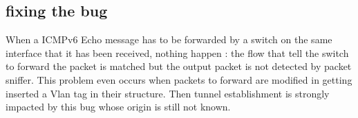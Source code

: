 \documentclass{article}
\begin{document}
\subsection{fixing the bug}
When a ICMPv6 Echo message has to be forwarded by a switch on the same
interface that it has been received, nothing happen : the flow that
tell the switch to forward the packet is matched but the output packet
is not detected by packet sniffer. This problem even occurs when
packets to forward are modified in getting inserted a Vlan tag in
their structure. Then tunnel establishment is strongly impacted by
this bug whose origin is still not known.
\end{document}

